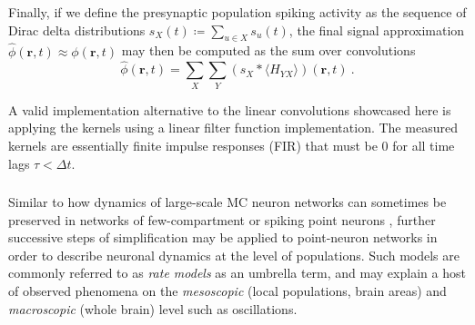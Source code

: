 Finally, if we define the presynaptic population spiking activity as the sequence of Dirac delta distributions $s_X(t) \coloneq \sum_{u \in X} s_u(t)$,
the final signal approximation $\hat{\phi}(\mathbf{r}, t) \approx \phi(\mathbf{r}, t)$ may then be computed as the sum over convolutions
\begin{equation}
\hat{\phi}(\mathbf{r}, t) = \sum_X \sum_Y \left(s_X \ast \langle H_{YX} \rangle \right)(\mathbf{r}, t)~.
\end{equation}

A valid implementation alternative to the linear convolutions showcased here is applying the kernels using a linear filter function implementation.
The measured kernels are essentially finite impulse responses (FIR) that must be 0 for all time lags $\tau < \Delta t$.


\subsubsection{}
\label{sec:Schemes:populationmodels}
Similar to how  dynamics of large-scale MC neuron networks  can sometimes be preserved in  networks of few-compartment or spiking point neurons , further successive steps of simplification may be applied to point-neuron networks in order to describe neuronal dynamics at the level of populations. Such models are commonly referred to as \emph{rate models} as an umbrella term, and may explain a host of observed phenomena on the \emph{mesoscopic} (local populations, brain areas) and \emph{macroscopic} (whole brain) level such as oscillations.



